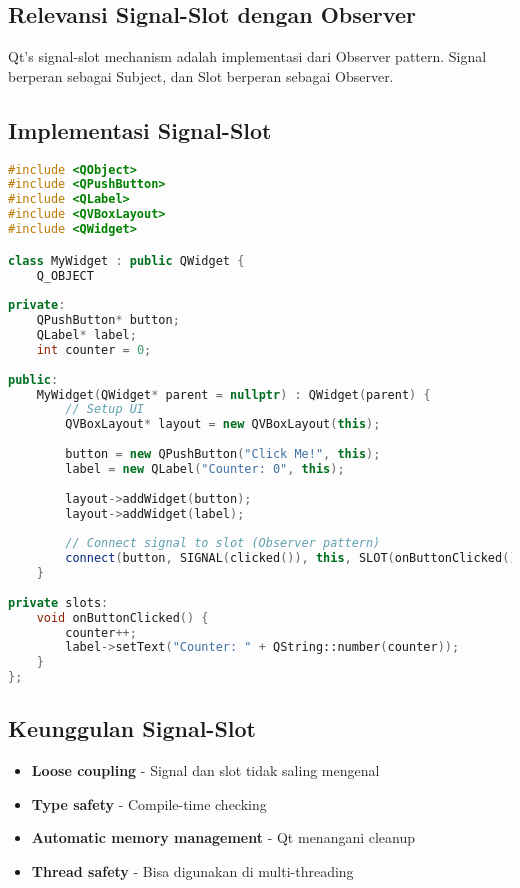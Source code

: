 \subsection{Relevansi Signal-Slot dengan Observer}

Qt's signal-slot mechanism adalah implementasi dari Observer pattern. Signal berperan sebagai Subject, dan Slot berperan sebagai Observer.

\subsection{Implementasi Signal-Slot}

\begin{lstlisting}[language=c++, caption=Signal-Slot Implementation]
#include <QObject>
#include <QPushButton>
#include <QLabel>
#include <QVBoxLayout>
#include <QWidget>

class MyWidget : public QWidget {
    Q_OBJECT
    
private:
    QPushButton* button;
    QLabel* label;
    int counter = 0;
    
public:
    MyWidget(QWidget* parent = nullptr) : QWidget(parent) {
        // Setup UI
        QVBoxLayout* layout = new QVBoxLayout(this);
        
        button = new QPushButton("Click Me!", this);
        label = new QLabel("Counter: 0", this);
        
        layout->addWidget(button);
        layout->addWidget(label);
        
        // Connect signal to slot (Observer pattern)
        connect(button, SIGNAL(clicked()), this, SLOT(onButtonClicked()));
    }
    
private slots:
    void onButtonClicked() {
        counter++;
        label->setText("Counter: " + QString::number(counter));
    }
};
\end{lstlisting}

\subsection{Keunggulan Signal-Slot}

\begin{itemize}
\item \textbf{Loose coupling} - Signal dan slot tidak saling mengenal
\item \textbf{Type safety} - Compile-time checking
\item \textbf{Automatic memory management} - Qt menangani cleanup
\item \textbf{Thread safety} - Bisa digunakan di multi-threading
\end{itemize}

